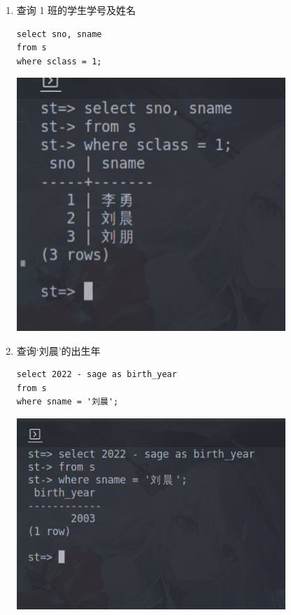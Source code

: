 \documentclass[hyperref,UTF8,12pt,a4paper]{ctexart}
\begin{document}
\begin{enumerate}
\item 查询 1 班的学生学号及姓名

\begin{verbatim}
select sno, sname
from s
where sclass = 1;
\end{verbatim}

\begin{center}
\includegraphics[width=0.8\textwidth]{9.png}
\end{center}

\item 查询‘刘晨’的出生年

\begin{verbatim}
select 2022 - sage as birth_year
from s
where sname = '刘晨';
\end{verbatim}

\begin{center}
\includegraphics[width=0.8\textwidth]{10.png}
\end{center}


\end{enumerate}
\end{document}

